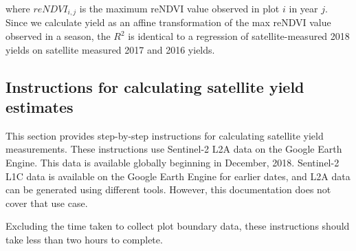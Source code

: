 \documentclass{article}
\begin{document}
where $reNDVI_{i, j}$ is the maximum reNDVI value observed in plot $i$ in year $j$. Since we calculate yield as an affine transformation of the max reNDVI value observed in a season, the $R^2$ is identical to a regression of satellite-measured 2018 yields on satellite measured 2017 and 2016 yields. 

\subsection{Instructions for calculating satellite yield estimates}

This section provides step-by-step instructions for calculating satellite yield measurements. These instructions use Sentinel-2 L2A data on the Google Earth Engine. This data is available globally beginning in December, 2018. Sentinel-2 L1C data is available on the Google Earth Engine for earlier dates, and L2A data can be generated using different tools. However, this documentation does not cover that use case. 

Excluding the time taken to collect plot boundary data, these instructions should take less than two hours to complete. 
\end{document}
